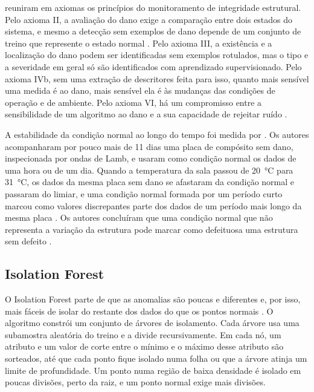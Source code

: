  reuniram em axiomas os princípios do monitoramento de integridade estrutural. Pelo axioma II, a avaliação do dano exige a comparação entre dois estados do sistema, e mesmo a detecção sem exemplos de dano depende de um conjunto de treino que represente o estado normal \cite[p.~1640, 1642]{worden2007}. Pelo axioma III, a existência e a localização do dano podem ser identificadas sem exemplos rotulados, mas o tipo e a severidade em geral só são identificados com aprendizado supervisionado. Pelo axioma IVb, sem uma extração de descritores feita para isso, quanto mais sensível uma medida é ao dano, mais sensível ela é às mudanças das condições de operação e de ambiente. Pelo axioma VI, há um compromisso entre a sensibilidade de um algoritmo ao dano e a sua capacidade de rejeitar ruído \cite[p.~1640]{worden2007}.

A estabilidade da condição normal ao longo do tempo foi medida por . Os autores acompanharam por pouco mais de \num{11} dias uma placa de compósito sem dano, inspecionada por ondas de Lamb, e usaram como condição normal os dados de uma hora ou de um dia. Quando a temperatura da sala passou de \SI{20}{\celsius} para \SI{31}{\celsius}, os dados da mesma placa sem dano se afastaram da condição normal e passaram do limiar, e uma condição normal formada por um período curto marcou como valores discrepantes parte dos dados de um período mais longo da mesma placa \cite[p.~330--331]{manson2000}. Os autores concluíram que uma condição normal que não representa a variação da estrutura pode marcar como defeituosa uma estrutura sem defeito \cite[p.~333]{manson2000}.

\subsection{Isolation Forest}\label{sec:fund-iforest}

O Isolation Forest parte de que as anomalias são poucas e diferentes e, por isso, mais fáceis de isolar do restante dos dados do que os pontos normais \cite{liu2008}. O algoritmo constrói um conjunto de árvores de isolamento. Cada árvore usa uma subamostra aleatória do treino e a divide recursivamente. Em cada nó, um atributo e um valor de corte entre o mínimo e o máximo desse atributo são sorteados, até que cada ponto fique isolado numa folha ou que a árvore atinja um limite de profundidade. Um ponto numa região de baixa densidade é isolado em poucas divisões, perto da raiz, e um ponto normal exige mais divisões.

